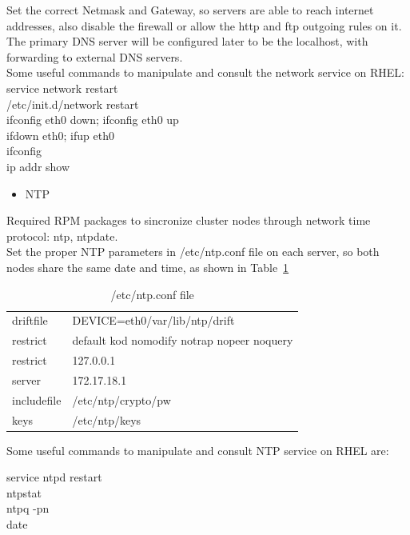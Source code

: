 \documentclass[a4paper, 12pt]{book}
\begin{document}
\noindent Set the correct Netmask and Gateway, so servers are able to reach internet addresses, also disable the firewall or allow the http and ftp outgoing rules on it. The primary DNS server will be configured later to be the localhost, with forwarding to external DNS servers.\\

\noindent Some useful commands to manipulate and consult the network service on RHEL:\\

\noindent service network restart\\
/etc/init.d/network restart\\
ifconfig eth0 down; ifconfig eth0 up\\
ifdown eth0; ifup eth0\\
ifconfig\\
ip addr show\\

\begin{itemize}
	\item NTP
\end{itemize}

\noindent Required RPM packages to sincronize cluster nodes through network time protocol: ntp, ntpdate.\\

\noindent Set the proper NTP parameters in /etc/ntp.conf file on each server, so both nodes share the same date and time, as shown in Table~\ref{table:ntp}

\FloatBarrier
\begin{table}[H]
  \centering
  \begin{tabular}{ | l l | }
    \hline
    driftfile & DEVICE=eth0/var/lib/ntp/drift \\
	restrict & default kod nomodify notrap nopeer noquery \\
    restrict & 127.0.0.1 \\
    server & 172.17.18.1 \\
    includefile & /etc/ntp/crypto/pw \\
    keys & /etc/ntp/keys \\
    \hline
  \end{tabular}
\caption{/etc/ntp.conf file}
\label{table:ntp}
\end{table}

\noindent Some useful commands to manipulate and consult NTP service on RHEL are:

service ntpd restart \\
ntpstat \\
ntpq -pn \\
date
\end{document}
